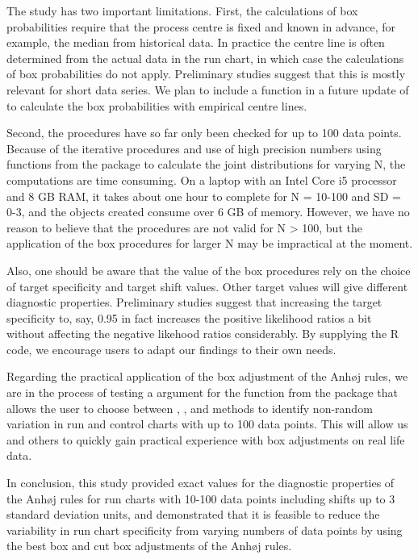 The study has two important limitations. First, the calculations of box
probabilities require that the process centre is fixed and known in
advance, for example, the median from historical data. In practice the
centre line is often determined from the actual data in the run chart,
in which case the calculations of box probabilities do not apply.
Preliminary studies suggest that this is mostly relevant for short data
series. We plan to include a function in a future update of
 to calculate the box probabilities with empirical
centre lines.

Second, the procedures have so far only been checked for up to 100 data
points. Because of the iterative procedures and use of high precision
numbers using functions from the  package \citep{rmpfr}
to calculate the joint distributions for varying N, the computations are
time consuming. On a laptop with an Intel Core i5 processor and 8 GB
RAM, it takes about one hour to complete  for N =
10-100 and SD = 0-3, and the objects created consume over 6 GB of
memory. However, we have no reason to believe that the procedures are
not valid for N \textgreater{} 100, but the application of the box
procedures for larger N may be impractical at the moment.

Also, one should be aware that the value of the box procedures rely on
the choice of target specificity and target shift values. Other target
values will give different diagnostic properties. Preliminary studies
suggest that increasing the target specificity to, say, 0.95 in fact
increases the positive likelihood ratios a bit without affecting the
negative likehood ratios considerably. By supplying the R code, we
encourage users to adapt our findings to their own needs.

Regarding the practical application of the box adjustment of the Anhøj
rules, we are in the process of testing a  argument for the
 function from the  package that allows
the user to choose between , , and
 methods to identify non-random variation in run and
control charts with up to 100 data points. This will allow us and others
to quickly gain practical experience with box adjustments on real life
data.

In conclusion, this study provided exact values for the diagnostic
properties of the Anhøj rules for run charts with 10-100 data points
including shifts up to 3 standard deviation units, and demonstrated that
it is feasible to reduce the variability in run chart specificity from
varying numbers of data points by using the best box and cut box
adjustments of the Anhøj rules.

